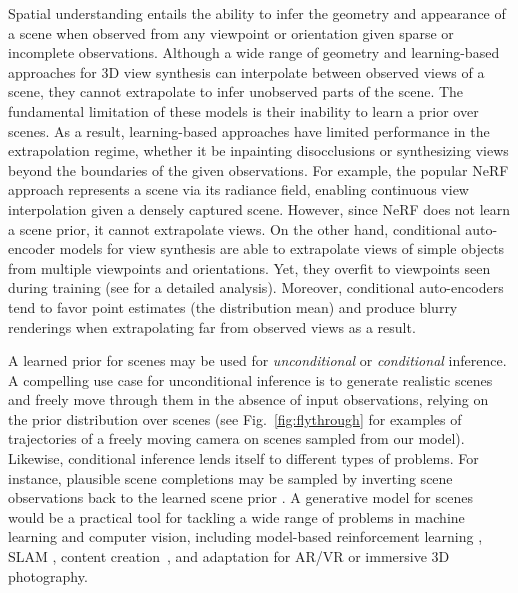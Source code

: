 \documentclass[10pt,twocolumn,letterpaper]{article}
\begin{document}
Spatial understanding entails the ability to infer the geometry and appearance of a scene when observed from any viewpoint or orientation given sparse or incomplete observations. Although a wide range of geometry and learning-based approaches for 3D view synthesis \cite{extremeviewsynthesis,mpi1,llff,nerf,derf,mpi2,mpi3} can interpolate between observed views of a scene, they cannot extrapolate to infer unobserved parts of the scene. The fundamental limitation of these models is their inability to learn a prior over scenes. As a result, learning-based approaches have limited performance in the extrapolation regime, whether it be inpainting disocclusions or synthesizing views beyond the boundaries of the given observations. For example, the popular NeRF \cite{nerf} approach represents a scene via its radiance field, enabling continuous view interpolation given a densely captured scene. However, since NeRF does not learn a scene prior, it cannot extrapolate views. On the other hand, conditional auto-encoder models for view synthesis \cite{gqn,appearanceflow,multiview2novelview,enr,tbn,tatarchenko} are able to extrapolate views of simple objects from multiple viewpoints and orientations. Yet, they overfit to viewpoints seen during training (see \cite{monocularviewsyn} for a detailed analysis). Moreover, conditional auto-encoders tend to favor point estimates (\eg the distribution mean) and produce blurry renderings when extrapolating far from observed views as a result. 

A learned prior for scenes may be used for \textit{unconditional} or \textit{conditional} inference. A compelling use case for unconditional inference is to generate realistic scenes and freely move through them in the absence of input observations, relying on the prior distribution over scenes (see Fig.~\ref{fig:flythrough} for examples of trajectories of a freely moving camera on scenes sampled from our model). Likewise, conditional inference lends itself to different types of problems. For instance, plausible scene completions may be sampled by inverting scene observations back to the learned scene prior \cite{ganinversion}. A generative model for scenes would be a practical tool for tackling a wide range of problems in machine learning and computer vision, including model-based reinforcement learning \cite{worldmodels}, SLAM \cite{neuralslam2,neuralslam1}, content creation~\cite{stylegan}, and adaptation for AR/VR or immersive 3D photography.
\end{document}
